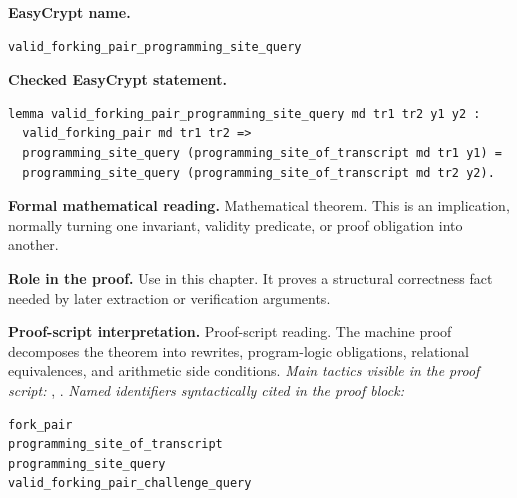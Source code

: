 \begin{formaltheorem}
\noindent\textbf{EasyCrypt name.}
\begin{lstlisting}[language=EasyCrypt,basicstyle=\ttfamily\scriptsize]
valid_forking_pair_programming_site_query
\end{lstlisting}
\noindent\textbf{Checked EasyCrypt statement.}
\begin{lstlisting}[language=EasyCrypt,basicstyle=\ttfamily\scriptsize]
lemma valid_forking_pair_programming_site_query md tr1 tr2 y1 y2 :
  valid_forking_pair md tr1 tr2 =>
  programming_site_query (programming_site_of_transcript md tr1 y1) =
  programming_site_query (programming_site_of_transcript md tr2 y2).
\end{lstlisting}
\noindent\textbf{Formal mathematical reading.}
Mathematical theorem. This is an implication, normally turning one invariant, validity predicate, or proof obligation into another.

\noindent\textbf{Role in the proof.}
Use in this chapter. It proves a structural correctness fact needed by later extraction or verification arguments.

\noindent\textbf{Proof-script interpretation.}
Proof-script reading. The machine proof decomposes the theorem into rewrites, program-logic obligations, relational equivalences, and arithmetic side conditions.
\emph{Main tactics visible in the proof script:} , .
\emph{Named identifiers syntactically cited in the proof block:}
\begin{lstlisting}[language=EasyCrypt,basicstyle=\ttfamily\scriptsize]
fork_pair
programming_site_of_transcript
programming_site_query
valid_forking_pair_challenge_query
\end{lstlisting}

\end{formaltheorem}

